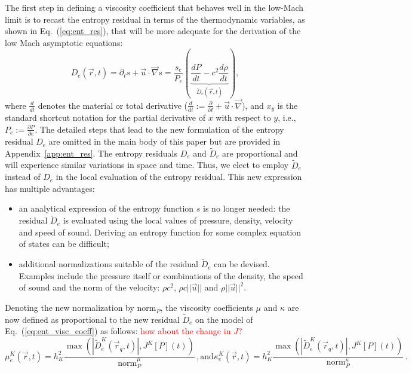 \documentclass[preprint,10pt]{elsarticle}
\newcommand{\grad}{\vec{\nabla}}
\newcommand{\norm}{\textrm{norm}}
\newcommand{\eqt}[1]{Eq.~(\ref{#1})}                     %
\newcommand{\app}[1]{Appendix~\ref{#1}}                   %
\newcommand{\tcr}[1]{\textcolor{red}{#1}}
\begin{document}
The first step in defining a viscosity coefficient that behaves well in the low-Mach limit is to recast the entropy residual in terms of the thermodynamic variables, as shown in \eqt{eq:ent_res}, that will be more adequate for the derivation of the low Mach asymptotic equations:
%
\begin{equation}
\label{eq:ent_res}
D_e(\vec{r},t) = \partial_t s + \vec{u} \cdot \grad s = \frac{s_e}{P_e} \left( \underbrace{\frac{d P}{dt} - c^2 \frac{d \rho}{dt}}_{\tilde{D}_e(\vec{r},t)} \right),
\end{equation} 
%
where $\frac{d }{dt}$ denotes the material or total derivative ($\frac{d }{dt}:= \frac{\partial}{\partial t} + \vec{u} \cdot \grad$), and $x_y$ is the standard shortcut notation for the partial derivative of $x$ with respect to $y$, i.e., $P_e:=\frac{\partial P}{\partial e}$. The detailed steps that lead to the new formulation of the entropy residual $D_e$ are omitted in the main body of this paper but are provided in \app{app:ent_res}. 
%
The entropy residuals $D_e$ and $\tilde{D}_e$ are proportional and will experience similar variations in space and time. Thus, we elect to employ $\tilde{D}_e$ instead of $D_e$ in the local evaluation of the entropy residual. This new expression has multiple advantages:
%
\begin{itemize}
\item an analytical expression of the entropy function $s$ is no longer needed: the residual $\tilde{D}_e$ is evaluated using the local values of pressure, density, velocity and speed of sound. Deriving an entropy function for some complex equation of states can be difficult;
\item additional normalizations suitable of the residual $\tilde{D}_e$ can be devised. Examples include the pressure itself or combinations of the density, the speed of sound and the norm of the velocity: $\rho c^2$, $\rho c || \vec{u} ||$ and $\rho || \vec{u} ||^2$. 
\end{itemize}
%
Denoting the new normalization by $\norm_P$, the viscosity coefficients $\mu$ and $\kappa$ are now defined as proportional to the new  residual $\tilde{D}_e$ on the model of \eqt{eq:ent_visc_coeff} as follows:
%
\tcr{how about the change in $J$?}
\begin{subequations}
\label{eq:visc_definition}
\begin{equation}
\mu^K_e(\vec{r},t)    = h_K^2 \frac{\max\left( | \tilde{D}^K_e(\vec{r}_q,t) |, J^K[P](t) \right)}{\norm_P^\mu}    \, ,
\end{equation} 
\text{and} 
\begin{equation}
\kappa^K_e(\vec{r},t) = h_K^2 \frac{\max\left( | \tilde{D}^K_e(\vec{r}_q,t) |, J^K[P](t) \right)}{\norm_P^\kappa} \, .
\end{equation}
\end{subequations}
\end{document}
